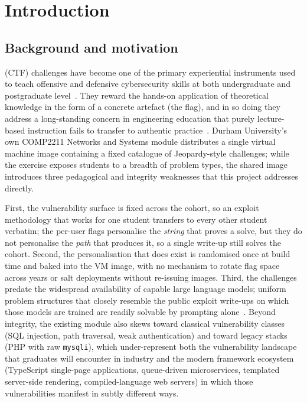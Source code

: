 
\ifCLASSOPTIONcompsoc
{}
\else
\section{Introduction}
\label{sec:introduction}
\fi

\subsection{Background and motivation}
 (CTF) challenges have become one of the
primary experiential instruments used to teach offensive and
defensive cybersecurity skills at both undergraduate and postgraduate
level~\cite{KeesPetrelli,Vykopal}. They reward the hands-on application
of theoretical knowledge in the form of a concrete artefact
(the flag), and in so doing they address a long-standing concern in
engineering education that purely lecture-based instruction fails to
transfer to authentic practice~\cite{Dewey1938,kolb1984}. Durham
University's own COMP2211 Networks and Systems module distributes a
single virtual machine image containing a fixed catalogue of
Jeopardy-style challenges; while the exercise exposes students to a
breadth of problem types, the shared image introduces three pedagogical
and integrity weaknesses that this project addresses directly.

First, the vulnerability surface is fixed across the cohort, so an
exploit methodology that works for one student transfers to every
other student verbatim; the per-user flags personalise the
\emph{string} that proves a solve, but they do not personalise the
\emph{path} that produces it, so a single write-up still solves the
cohort. Second, the personalisation that does exist is randomised
once at build time and baked into the VM image, with no mechanism to
rotate flag space across years or salt deployments without re-issuing
images. Third, the challenges predate the widespread availability of
capable large language models; uniform problem structures that
closely resemble the public exploit write-ups on which those models
are trained are readily solvable by prompting
alone~\cite{ji2025}. Beyond integrity, the existing module also skews
toward classical vulnerability classes (SQL injection, path
traversal, weak authentication) and toward legacy stacks (PHP with
raw \texttt{mysqli}), which under-represent both the vulnerability
landscape that graduates will encounter in industry and the modern
framework ecosystem (TypeScript single-page applications, queue-driven
microservices, templated server-side rendering, compiled-language web
servers) in which those vulnerabilities manifest in subtly different
ways.


